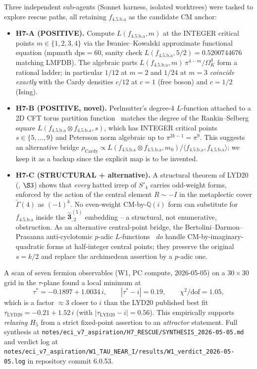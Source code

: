 \documentclass[a4paper,11pt]{article}
\newcommand{\Spf}{S'_4}
\newcommand{\hhat}[1]{\widehat{\mathbf{#1}}}
\newcommand{\OmK}{\Omega_K}
\newcommand{\fLM}{f_{\text{4.5.b.a}}}
\newcommand{\Qi}{\mathbb{Q}(i)}
\theoremstyle{definition}
\theoremstyle{remark}
\begin{document}
Three independent sub-agents (Sonnet harness, isolated worktrees) were
tasked to explore rescue paths, all retaining $\fLM$ as the
candidate CM anchor:
\begin{itemize}
  \item \textbf{H7-A (POSITIVE).}  Compute $L(\fLM, m)$ at the
    INTEGER critical points $m\in\{1,2,3,4\}$ via the
    Iwaniec--Kowalski approximate functional equation
    \cite[Thm.~5.3]{IwaKow04} (mpmath dps$=60$, sanity check
    $L(\fLM,5/2)=0.5200744676$ matching LMFDB).  The
    algebraic parts $L(\fLM,m)\,\pi^{4-m}/\OmK^{4}$ form a
    rational ladder; in particular $1/12$ at $m=2$ and $1/24$ at
    $m=3$ \emph{coincide exactly} with the Cardy
    densities $c/12$ at $c=1$ (free boson) and $c=1/2$ (Ising).
  \item \textbf{H7-B (POSITIVE, novel).}  Perlmutter's degree-4
    $L$-function attached to a 2D CFT torus partition
    function~\cite{Perlmutter25} matches the degree of the
    Rankin--Selberg square $L(\fLM \otimes \fLM, s)$, which has
    INTEGER critical points $s\in\{5,\ldots,9\}$ and Petersson norm
    algebraic up to $\pi^{2k-1}=\pi^{9}$.  This suggests an
    alternative bridge $\rho_{\mathrm{Cardy}}\propto
    L(\fLM\otimes\fLM,m_{0})/\langle\fLM,\fLM\rangle$;
    we keep it as a backup since the explicit map is to be invented.
  \item \textbf{H7-C (STRUCTURAL + alternative).}  A structural
    theorem of LYD20 (\cite[Tab.~Level4 MM]{LYD20}, $\S 3$) shows that
    \emph{every} hatted irrep of $\Spf$ carries odd-weight forms,
    enforced by the action of the central element $R\sim -I$ in the
    metaplectic cover $\widetilde{\Gamma}(4)$ as $(-1)^{k}$.  No
    even-weight CM-by-$\Qi$ form can substitute for $\fLM$ inside the
    $\hhat{3}_{,2}^{(5)}$ embedding -- a structural, not enumerative,
    obstruction.  As an alternative central-point bridge, the
    Bertolini--Darmon--Prasanna anti-cyclotomic $p$-adic
    $L$-functions~\cite{BDP13} \emph{do} handle CM-by-imaginary-quadratic
    forms at half-integer central points; they preserve the original
    $s=k/2$ and replace the archimedean assertion by a $p$-adic one.
\end{itemize}

A scan of seven fermion observables (W1, PC compute, 2026-05-05) on a
$30\times 30$ grid in the $\tau$-plane found a local minimum at
\begin{equation}
  \tau^{*} = -0.1897 + 1.0034\,i,\qquad
  |\tau^{*} - i| = 0.19,\qquad
  \chi^{2}/\mathrm{dof} = 1.05,
\end{equation}
which is a factor $\approx 3$ closer to $i$ than the LYD20 published
best fit $\tau_{\mathrm{LYD20}}=-0.21+1.52\,i$ (with
$|\tau_{\mathrm{LYD20}}-i|=0.56$).  This empirically supports
\emph{relaxing} $H_5$ from a strict fixed-point assertion to an
\emph{attractor} statement.  Full synthesis at
\texttt{notes/eci\_v7\_aspiration/H7\_RESCUE/SYNTHESIS\_2026-05-05.md}
and verdict log at
\texttt{notes/eci\_v7\_aspiration/W1\_TAU\_NEAR\_I/results/W1\_verdict\_2026-05-05.log}
in repository commit 6.0.53.
\end{document}
